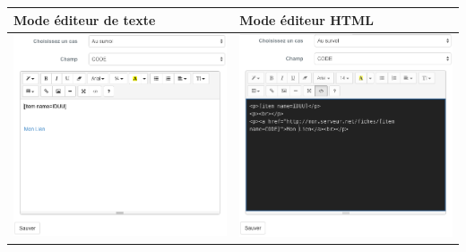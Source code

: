 \documentclass[letterpaper,10pt,french]{sphinxmanual}
\begin{document}
\begin{tabulary}{\linewidth}{|L|L|}
\hline

\textbf{Mode éditeur de texte}
 & 
\textbf{Mode éditeur HTML}
\\
\hline
\includegraphics[width=1.000\linewidth]{set-template-window.png}
 & 
\includegraphics[width=1.000\linewidth]{set-template-html-window.png}
\\
\hline\end{tabulary}
\end{document}
